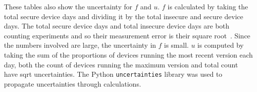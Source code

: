 These tables also show the uncertainty for $f$ and $u$.
$f$ is calculated by taking the total secure device days and dividing it by the total insecure and secure device days.
The total secure device days and total insecure device days are both counting experiments and so their measurement error is their square root~\cite{Taylor1997}.
Since the numbers involved are large, the uncertainty in $f$ is small.
$u$ is computed by taking the sum of the proportions of devices running the most recent version each day, both the count of devices running the maximum version and total count have sqrt uncertainties.
The Python \texttt{uncertainties} library was used to propagate uncertainties through calculations.

